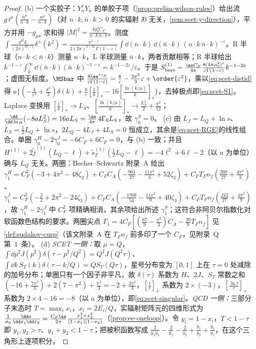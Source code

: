 \begin{proof}
(b) 一个实胶子：$Y_n^\dagger Y_{\bar n}$ 的单胶子项（\cref{prop:prelim-wilson-rules}）给出流 $g\,t^a(\frac{\bar n^\mu}{\bar n\cdot k}-\frac{n^\mu}{n\cdot k})$（对 $n\cdot k,\bar n\cdot k>0$ 的实辐射 $\ii0$ 无关，\cref{rem:scet-y-direction}），平方并用 $-g_{\mu\nu}$ 求和得 $|M|^2=\frac{4g_0^2C_F}{n\cdot k\,\bar n\cdot k}$。测度 $\int\frac{\dd^Dk}{(2\pi)^{D-1}}\delta^+(k^2)=\frac{\pi^{1-\varepsilon}}{2(2\pi)^{3-2\varepsilon}\Gamma(1-\varepsilon)}\int\dd(n\cdot k)\,\dd(\bar n\cdot k)\,(n\cdot k\,\bar n\cdot k)^{-\varepsilon}$。R 半球（$n\cdot k<\bar n\cdot k$）测量 $n\cdot k$，L 半球测量 $\bar n\cdot k$，两者贡献相等；R 半球给出 $k^{-1-\varepsilon}\int_k^\infty\dd(\bar n\cdot k)(\bar n\cdot k)^{-1-\varepsilon}=k^{-1-2\varepsilon}/\varepsilon$。于是 $S^{(1)}_{\rm bare}=\frac{\as C_F}{4\pi}\frac{8(4\pi\mu_0^2)^\varepsilon}{\varepsilon\Gamma(1-\varepsilon)}k^{-1-2\varepsilon}$；虚图无标度。$\MSbar$ 中 $\frac{8\ee^{\varepsilon\gamma_E}}{\varepsilon\Gamma(1-\varepsilon)}=\frac8\varepsilon-\frac{2\pi^2}{3}\varepsilon+\order{\varepsilon^2}$，乘以\cref{eq:scet-distid}得 $a\{(-\frac4{\varepsilon^2}+\frac{\pi^2}3)\delta(k)+\frac8\varepsilon[\frac1k]_*-16[\frac{\ln(k/\mu)}{k}]_*\}$，去掉极点即\cref{eq:scet-S1}。Laplace 变换用 $[\frac1k]_*\to L_S$、$[\frac{\ln(k/\mu)}k]_*\to\frac{L_S^2}2+\frac{\pi^2}{12}$；$\frac{\dd}{\dd\ln\mu}(-8aL_S^2)=16aL_S=\frac{\as}{4\pi}\,4\Gamma_0L_S$，故 $\gamma^S_0=0$。%
(c) 由 $L_J=L_Q+\ln s$、$L_S=\frac12L_Q+\ln s$，$2L_Q-4L_J+4L_S=0$ 恒成立，其余是\cref{eq:scet-RGE}的线性组合。单圈 $\gamma^H_0-2\gamma^J_0=-6C_F+6C_F=0$，与 (b) 一致；并且 $H^{(1)}+2\tilde j^{(1)}(L_Q-\ell)+\tilde s^{(1)}_T(\frac12L_Q-\ell)=-4\ell^2+6\ell-2$（以 $a$ 为单位）确与 $L_Q$ 无关。两圈：Becher--Schwartz 附录~A 给出\cite{BecherSchwartz2008}
$\gamma^H_1=C_F^2(-3+4\pi^2-48\zeta_3)+C_FC_A(-\frac{961}{27}-\frac{11\pi^2}{3}+52\zeta_3)+C_FT_Fn_f(\frac{260}{27}+\frac{4\pi^2}{3})$、$\gamma^J_1=C_F^2(-\frac32+2\pi^2-24\zeta_3)+C_FC_A(-\frac{1769}{54}-\frac{11\pi^2}{9}+40\zeta_3)+C_FT_Fn_f(\frac{242}{27}+\frac{4\pi^2}{9})$，故 $\gamma^H_1-2\gamma^J_1$ 中 $C_F^2$ 项精确相消，其余项给出所述 $\gamma^S_1$；这符合非阿贝尔指数化对软函数色结构的要求。两圈尖点 $\Gamma_1=4C_F[(\frac{67}9-\frac{\pi^2}3)C_A-\frac{20}9T_Fn_f]$ 见\cref{def:sudakov-cusp}（该文附录~A 在 $T_Fn_f$ 前多印了一个 $C_F$，见附录~Q 第~1~条）。%
(d) \emph{SCET 一侧：}取 $\mu=Q$，$\int\dd p^2J(p^2)\delta(\tau-p^2/Q^2)=Q^2J(Q^2\tau)$、$\int\dd k\,S_T(k)\delta(\tau-k/Q)=QS_T(Q\tau)$，星号分布变为 $[0,1]$ 上在 $\tau=0$ 处减除的加号分布；单圈只有一个因子非平凡，故 $\delta(\tau)$ 系数为 $H$、$2J$、$S_T$ 常数之和 $(-16+\frac{7\pi^2}3)+2(7-\pi^2)+\frac{\pi^2}3=-2+\frac{2\pi^2}{3}$，$[\frac1\tau]_+$ 系数为 $2\times(-3)$，$[\frac{\ln\tau}\tau]_+$ 系数为 $2\times4-16=-8$（以 $a$ 为单位），即\cref{eq:scet-singular}。\emph{QCD 一侧：}三部分子末态时 $T=\max_ix_i$，$x_i=2E_i/Q$，实辐射矩阵元的四维形式为 $\frac1{\sigma_0}\frac{\dd\sigma}{\dd x_1\dd x_2}=\frac{C_F\as}{2\pi}\frac{x_1^2+x_2^2}{(1-x_1)(1-x_2)}$（\cref{prop:ee-oneloop}）。令 $y_i=1-x_i$，$T<1-\tau$ 即 $y_1,y_2>\tau$、$y_1+y_2<1-\tau$；把被积函数写成 $\frac{2}{y_1y_2}-\frac2{y_1}-\frac2{y_2}+\frac{y_1}{y_2}+\frac{y_2}{y_1}$，在这个三角形上逐项积分，

\end{proof}
